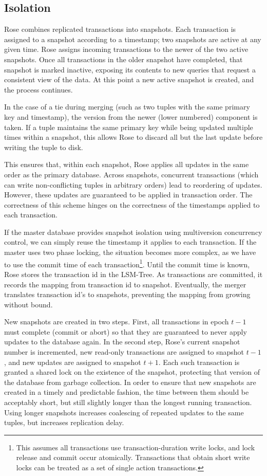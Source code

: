 \documentclass{vldb}
\newcommand{\rows}{Rose\xspace}
\newcommand{\rowss}{Rose's\xspace}
\begin{document}
\subsection{Isolation}
\label{sec:isolation}
\rows combines replicated transactions into snapshots.  Each transaction
is assigned to a snapshot according to a timestamp; two snapshots are
active at any given time.  \rows assigns incoming transactions to the
newer of the two active snapshots.  Once all transactions in the older
snapshot have completed, that snapshot is marked inactive, exposing
its contents to new queries that request a consistent view of the
data.  At this point a new active snapshot is created, and the process
continues.

In the case of a tie
during merging (such as two tuples with the same primary key and
timestamp), the version from the newer (lower numbered) component is
taken.  If a tuple maintains the same primary key while being updated
multiple times within a snapshot, this allows \rows to discard all but
the last update before writing the tuple to disk.

This ensures that, within each snapshot, \rows applies all updates in the
same order as the primary database.  Across snapshots, concurrent
transactions (which can write non-conflicting tuples in arbitrary
orders) lead to reordering of updates.  However, these updates are
guaranteed to be applied in transaction order.  The correctness of
this scheme hinges on the correctness of the timestamps applied to
each transaction.

If the master database provides snapshot isolation using multiversion
concurrency control, we can
simply reuse the timestamp it applies to each transaction.  If the
master uses two phase locking, the situation becomes more complex, as
we have to use the commit time of each transaction\footnote{This assumes
  all transactions use transaction-duration write locks, and lock
  release and commit occur atomically.  Transactions that obtain short
  write locks can be treated as a set of single action transactions.}.
Until the commit time is known, \rows stores the transaction id in the
LSM-Tree.  As transactions are committed, it records the mapping from
transaction id to snapshot.  Eventually, the merger translates
transaction id's to snapshots, preventing the mapping from growing
without bound.

New snapshots are created in two steps.  First, all transactions in
epoch $t-1$ must complete (commit or abort) so that they are
guaranteed to never apply updates to the database again.  In the
second step, \rowss current snapshot number is incremented, new
read-only transactions are assigned to snapshot $t-1$, and new updates
are assigned to snapshot $t+1$.  Each such transaction is granted a
shared lock on the existence of the snapshot, protecting that version
of the database from garbage collection.  In order to ensure that new
snapshots are created in a timely and predictable fashion, the time
between them should be acceptably short, but still slightly longer
than the longest running transaction.  Using longer snapshots
increases coalescing of repeated updates to the same tuples,
but increases replication delay.
\end{document}
